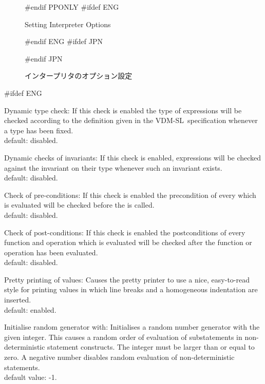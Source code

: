 \documentclass[\pformat,12pt]{article}
\newcommand{\vdmslpp}{VDM-SL}
\newcommand{\vdmslpp}{VDM++}
\begin{document}
\begin{figure}[tbh]
\begin{center}
#endif PPONLY
#ifdef ENG
\caption{Setting Interpreter Options}
#endif ENG
#ifdef JPN
\caption{インタープリタのオプション設定}
#endif JPN
\label{fig:optint}
\end{center}
\end{figure}

\begin{list}{}{}
#ifdef ENG
\item[{\sf Dynamic type check}:] If this check is enabled the
  type of expressions will be checked according to the definition
  given in the \vdmslpp\ specification whenever a type has been
  fixed. \\
  default: disabled.
  
\item[{\sf Dynamic checks of invariants}:] If this check is
  enabled, expressions will be checked against the invariant on their
  type whenever such an invariant exists. \\
  default: disabled.
  
\item[{\sf Check of pre-conditions}:] If this check is enabled
  the precondition of every  which is evaluated will be checked before
  the  is
  called. \\
  default: disabled.
  
\item[{\sf Check of post-conditions}:]
  If this check is enabled 
  the postconditions of every function and operation which is
  evaluated will be checked after the function or operation has been
  evaluated. \\
  default: disabled.
  
\item[{\sf Pretty printing of values}:] Causes the pretty printer to
  use a nice, easy-to-read style for printing values in which line
  breaks and a homogeneous indentation are inserted. \\
  default: enabled.
  
\item[{\sf Initialise random generator with}:]
Initialises a random number generator with the given integer.  This
causes a random order of evaluation of substatements in
non-deterministic statement constructs.  The integer must be larger
than or equal to zero. A
negative number disables random evaluation of non-deterministic
statements. \\
default value: -1.


\end{list}
\end{document}
